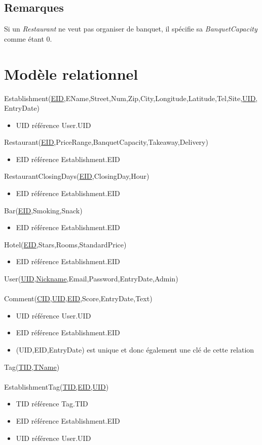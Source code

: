 \documentclass[11pt,a4paper]{report}
\begin{document}
\subsection*{Remarques}
Si un \textit{Restaurant} ne veut pas organiser de banquet, il spécifie sa \textit{BanquetCapacity} comme étant 0.

\section*{Modèle relationnel}
\noindent
Establishment(\underline{EID},EName,Street,Num,Zip,City,Longitude,Latitude,Tel,Site,\underline{UID},EntryDate)
\begin{itemize}
\item UID référence User.UID\\
\end{itemize}
Restaurant(\underline{EID},PriceRange,BanquetCapacity,Takeaway,Delivery)
\begin{itemize}
\item EID référence Establishment.EID\\
\end{itemize} 
RestaurantClosingDays(\underline{EID},ClosingDay,Hour)
\begin{itemize}
\item EID référence Establishment.EID\\
\end{itemize}
Bar(\underline{EID},Smoking,Snack)
\begin{itemize}
\item EID référence Establishment.EID\\
\end{itemize}
Hotel(\underline{EID},Stars,Rooms,StandardPrice)
\begin{itemize}
\item EID référence Establishment.EID\\
\end{itemize}
User(\underline{UID},\underline{Nickname},Email,Password,EntryDate,Admin)\\ \\
%
Comment(\underline{CID},\underline{UID},\underline{EID},Score,EntryDate,Text)
\begin{itemize}
\item UID référence User.UID
\item EID référence Establishment.EID
\item (UID,EID,EntryDate) est unique et donc également une clé de cette relation\\
\end{itemize}
Tag(\underline{TID},\underline{TName})\\ \\
EstablishmentTag(\underline{TID,EID,UID})
\begin{itemize}
\item TID référence Tag.TID
\item EID référence Establishment.EID
\item UID référence User.UID\\
\end{itemize}
\end{document}
